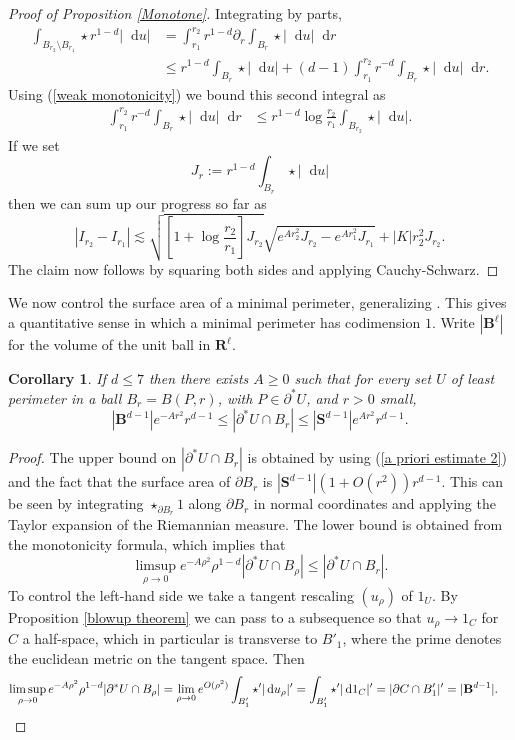 \documentclass[reqno,11pt]{amsart}
\newcommand{\RR}{\mathbf{R}}
\newcommand{\Sph}{\mathbf S}
\newcommand{\Ball}{\mathbf{B}}
\newcommand*\dif{\mathop{}\!\mathrm{d}}
\newtheorem{corollary}[theorem]{Corollary}
\theoremstyle{definition}
\numberwithin{equation}{section}
\begin{document}
\begin{proof}[Proof of Proposition \ref{Monotone}]
Integrating by parts,
\begin{align*}
\int_{B_{r_2} \setminus B_{r_1}} \star r^{1 - d} |\dif u| &= \int_{r_1}^{r_2} r^{1 - d} \partial_r \int_{B_r} \star |\dif u| \dif r \\
&\leq r^{1 - d} \int_{B_r} \star |\dif u| + (d - 1) \int_{r_1}^{r_2} r^{-d} \int_{B_r} \star |\dif u| \dif r.
\end{align*}
Using (\ref{weak monotonicity}) we bound this second integral as
\begin{align*}
\int_{r_1}^{r_2} r^{-d} \int_{B_r} \star |\dif u| \dif r &\leq r^{1 - d} \log \frac{r_2}{r_1} \int_{B_{r_2}} \star |\dif u|.
\end{align*}
If we set
$$J_r := r^{1 - d} \int_{B_r} \star |\dif u|$$
then we can sum up our progress so far as
$$|I_{r_2} - I_{r_1}| \lesssim \sqrt{\left[1 + \log \frac{r_2}{r_1}\right] J_{r_2}} \sqrt{e^{Ar_2^2} J_{r_2} - e^{Ar_1^2} J_{r_1}} + |K|r_2^2 J_{r_2}.$$
The claim now follows by squaring both sides and applying Cauchy-Schwarz.
\end{proof}

We now control the surface area of a minimal perimeter, generalizing \cite[Remark 5.13]{Giusti77}.
This gives a quantitative sense in which a minimal perimeter has codimension $1$.
Write $|\Ball^\ell|$ for the volume of the unit ball in $\RR^\ell$.

\begin{corollary}\label{doubling dimension}
If $d \leq 7$ then there exists $A \geq 0$ such that for every set $U$ of least perimeter in a ball $B_r = B(P, r)$, with $P \in \partial^* U$, and $r > 0$ small,
$$|\Ball^{d - 1}|e^{-Ar^2}r^{d - 1} \leq |\partial^*U \cap B_r| \leq |\Sph^{d - 1}|e^{Ar^2} r^{d - 1}.$$
\end{corollary}
\begin{proof}
The upper bound on $|\partial^* U \cap B_r|$ is obtained by using (\ref{a priori estimate 2}) and the fact that the surface area of $\partial B_r$ is $|\Sph^{d - 1}|(1 + O(r^2))r^{d - 1}$.
This can be seen by integrating $\star_{\partial B_r} 1$ along $\partial B_r$ in normal coordinates and applying the Taylor expansion of the Riemannian measure.
The lower bound is obtained from the monotonicity formula, which implies that
$$\limsup_{\rho \to 0} e^{-A\rho^2} \rho^{1 - d} |\partial^* U \cap B_\rho| \leq |\partial^* U \cap B_r|.$$
To control the left-hand side we take a tangent rescaling $(u_\rho)$ of $1_U$.
By Proposition \ref{blowup theorem} we can pass to a subsequence so that $u_\rho \to 1_C$ for $C$ a half-space, which in particular is transverse to $B'_1$, where the prime denotes the euclidean metric on the tangent space.
Then
\begin{align*}
\limsup_{\rho \to 0} e^{-A\rho^2} \rho^{1 - d} |\partial^* U \cap B_\rho| &= \lim_{\rho \to 0} e^{O(\rho^2)} \int_{B'_1} \star'|\dif u_\rho|' = \int_{B'_1} \star'|\dif 1_C|' = |\partial C \cap B'_1|' = |\Ball^{d - 1}|. \qedhere
\end{align*}
\end{proof}
\end{document}
